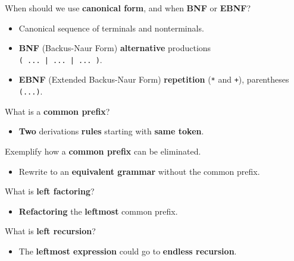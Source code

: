 \documentclass[11pt]{beamer}
\begin{document}
\begin{frame}

\begin{block}{When should we use \textbf{canonical form}, and when \textbf{BNF} or \textbf{EBNF}?}
\begin{itemize}
\item Canonical sequence of terminals and nonterminals.
\item \textbf{BNF} (Backus-Naur Form) \textbf{alternative} productions\\ \texttt{( ... | ... | ... )}.
\item \textbf{EBNF} (Extended Backus-Naur Form) \textbf{repetition} (\texttt{*} and \texttt{+}), parentheses \texttt{(...)}.
\end{itemize}
\end{block}


\begin{block}{What is a \textbf{common prefix}?}
\begin{itemize}
\item \textbf{Two} derivations \textbf{rules} starting with \textbf{same token}.
\end{itemize}
\end{block}


\begin{block}{Exemplify how a \textbf{common prefix} can be eliminated.}
\begin{itemize}
\item Rewrite to an \textbf{equivalent grammar} without the common prefix.
\end{itemize}
\end{block}


\end{frame}

\begin{frame}

\begin{block}{What is \textbf{left factoring}?}
\begin{itemize}
\item \textbf{Refactoring} the \textbf{leftmost} common prefix.
\end{itemize}
\end{block}

\begin{block}{What is \textbf{left recursion}?}
\begin{itemize}
\item The \textbf{leftmost expression} could go to \textbf{endless recursion}.
\end{itemize}
\end{block}

\end{frame}
\end{document}
